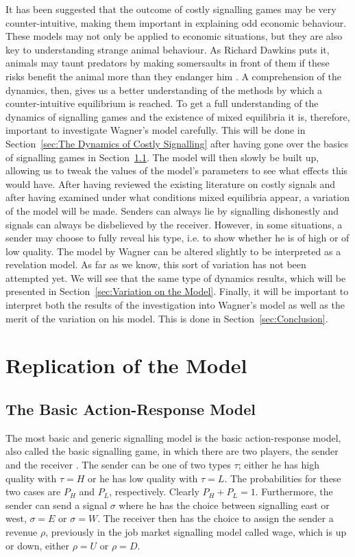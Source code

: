 \documentclass[a4paper,10pt]{article}
\numberwithin{equation}{section}
\begin{document}
It has been suggested that the outcome of costly signalling games may be very counter-intuitive, making them important in explaining odd economic behaviour. These models may not only be applied to economic situations, but they are also key to understanding strange animal behaviour. As Richard Dawkins puts it, animals may taunt predators by making somersaults in front of them if these risks benefit the animal more than they endanger him \cite{Dawkins1976}. A comprehension of the dynamics, then, gives us a better understanding of the methods by which a counter-intuitive equilibrium is reached. To get a full understanding of the dynamics of signalling games and the existence of mixed equilibria it is, therefore, important to investigate Wagner's model carefully. This will be done in Section~\ref{sec:The Dynamics of Costly Signalling} after having gone over the basics of signalling games in Section~\ref{sec:The Basic Action-Response Model}. The model will then slowly be built up, allowing us to tweak the values of the model's parameters to see what effects this would have. After having reviewed the existing literature on costly signals and after having examined under what conditions mixed equilibria appear, a variation of the model will be made. Senders can always lie by signalling dishonestly and signals can always be disbelieved by the receiver. However, in some situations, a sender may choose to fully reveal his type, i.e. to show whether he is of high or of low quality. The model by Wagner can be altered slightly to be interpreted as a revelation model. As far as we know, this sort of variation has not been attempted yet. We will see that the same type of dynamics results, which will be presented in Section~\ref{sec:Variation on the Model}. Finally, it will be important to interpret both the results of the investigation into Wagner's model as well as the merit of the variation on his model. This is done in Section~\ref{sec:Conclusion}.

\section{Replication of the Model}
\label{sec:Replication of the Model}
\subsection{The Basic Action-Response Model}
\label{sec:The Basic Action-Response Model}

The most basic and generic signalling model is the basic action-response model, also called the basic signalling game, in which there are two players, the sender and the receiver \cite{Hurd1995, Fudenberg1991}. The sender can be one of two types $\tau$; either he has high quality with $\tau=H$ or he has low quality with $\tau=L$. The probabilities for these two cases are $P_H$ and $P_L$, respectively. Clearly $P_H+P_L=1$. Furthermore, the sender can send a signal $\sigma$ where he has the choice between signalling east or west, $\sigma=E$ or $\sigma=W$. The receiver then has the choice to assign the sender a revenue $\rho$, previously in the job market signalling model called wage, which is up or down, either $\rho=U$ or $\rho=D$.
\end{document}
